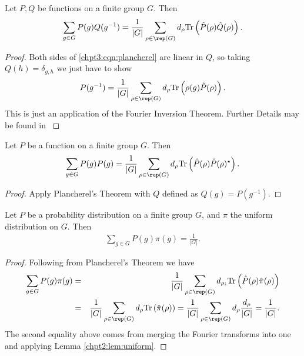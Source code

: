 \documentclass[11pt]{report}
\begin{document}
\begin{corollary}
	Let $P, Q$ be functions on a finite group $G$. Then
	\begin{eqnarray}
	\label{chpt3:eqn:plancherel}
	\sum_{g \in G} P(g)Q(g^{-1}) = \frac{1}{|G|}\sum_{\rho \in \rep(G)} 
	d_{\rho} 
	\textnormal{Tr}\left(\hat{P}(\rho) \hat{Q}(\rho)\right)   .
	\end{eqnarray}
\end{corollary}

\begin{proof}
	Both sides of \eqref{chpt3:eqn:plancherel} are linear in $Q$, so taking 
	$Q(h) = \delta_{g,h}$ we just have to show
	\[P(g^{-1}) = \frac{1}{|G|}\sum_{\rho \in \rep(G)} d_{\rho} 
	\textnormal{Tr}\left(\rho(g)\hat{P}(\rho)\right).\]
	This is just an application of the Fourier Inversion Theorem. Further 
	Details may be found in \cite[Chapter 2C]{Diaconis1988}
\end{proof}


\begin{corollary}
	\label{chpt3:cor:plan2}
	Let $P$ be a function on a finite group $G$. Then
	\begin{eqnarray}
	\label{chpt3:eqn:plancherel2}
	\sum_{g \in G} P(g)P(g) = \frac{1}{|G|}\sum_{\rho \in \rep(G)} d_{\rho} 
	\textnormal{Tr}\left(\hat{P}(\rho)\hat{P}(\rho)^{\star}\right)   .
	\end{eqnarray}
\end{corollary}

\begin{proof}
	Apply Plancherel's Theorem with $Q$ defined as $Q(g) = P(g^{-1})$. 
\end{proof}






\begin{corollary}
	Let $P$ be a probability distribution on  a finite group $G$, and $\pi$ the uniform 
	distribution on $G$. Then
	\begin{eqnarray}
	\label{chpt3:eqn:plancherel3}
	\sum_{g \in G} P(g)\pi(g) = \frac{1}{|G|}.
	\end{eqnarray}
\end{corollary}

\begin{proof}
	Following from Plancherel's Theorem we have
	\begin{eqnarray*}
		\sum_{g \in G} P(g)\pi(g) & = &\frac{1}{|G|}\sum_{\rho \in \rep(G)} 
		d_{\rho_{i}} 
		\textnormal{Tr}\left(\hat{P}(\rho)\hat{\pi}(\rho)\right)\\
		& = &\frac{1}{|G|}\sum_{\rho \in \rep(G)} d_{\rho} 
		\textnormal{Tr}\left(\hat{\pi}(\rho)\right) = \frac{1}{|G|}\sum_{\rho \in 
			\rep(G)} 
		d_{\rho} \frac{d_{\rho}}{|G|} = \frac{1}{|G|}. 
	\end{eqnarray*}	
	The second equality above comes from merging the Fourier transforms into 
	one and applying Lemma \ref{chpt2:lem:uniform}.
\end{proof}
\end{document}
